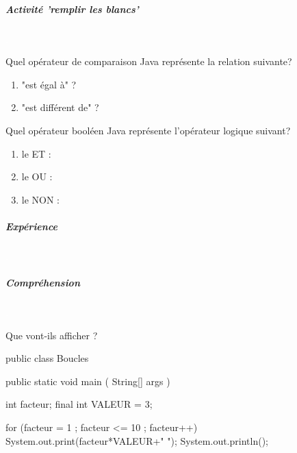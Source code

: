 \documentclass[11pt,a4paper]{article}
\begin{document}
			
		\subparagraph{Activit\'e 'remplir les blancs'} 
		
                \textcolor{white}{.} \par
            
								Quel op\'erateur de comparaison Java repr\'esente la relation suivante? 
							
            \par
        
					\begin{enumerate}
				
			\item "est \'egal \`a" ?                      \textcolor{gray}{\underline{\hspace*{2em}}} 
			\item "est diff\'erent de" ?                \textcolor{gray}{\underline{\hspace*{2em}}} 
					\end{enumerate}
				
								Quel op\'erateur bool\'een Java repr\'esente l'op\'erateur logique suivant? 
							
            \par
        
					\begin{enumerate}
				
			\item le ET :   \textcolor{gray}{\underline{\hspace*{2em}}} 
			\item le OU :   \textcolor{gray}{\underline{\hspace*{2em}}} 
			\item le NON :  \textcolor{gray}{\underline{\hspace*{1em}}} 
					\end{enumerate}
				
			
		\subparagraph{Exp\'erience} 
		
					\textcolor{white}{.} \par
				
            \par
        
			
		\subparagraph{Compr\'ehension} 
		
                \textcolor{white}{.} \par
            
							  Que vont-ils afficher ?
              \begin{Java}
public class Boucles {

	public static void main ( String[] args ) {
		int facteur;
		final int VALEUR = 3;
	
		for (facteur = 1 ; facteur <= 10 ; facteur++){		
			System.out.print(facteur*VALEUR+" ");
		}
		System.out.println();
	}
}			\end{Java} \textcolor{gray}{\underline{\hspace*{16em}}} 
			
\end{document}
